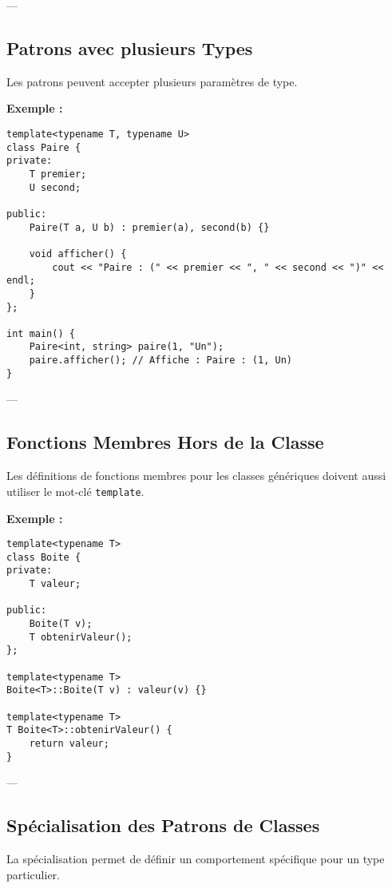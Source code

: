 ---

\subsection{ Patrons avec plusieurs Types}
Les patrons peuvent accepter plusieurs paramètres de type.

\textbf{Exemple :}
\begin{tcolorbox}[colframe=blue!50!black, colback=blue!5!white, title=Exemple de Patron avec Plusieurs Types]
\begin{verbatim}
template<typename T, typename U>
class Paire {
private:
    T premier;
    U second;

public:
    Paire(T a, U b) : premier(a), second(b) {}

    void afficher() {
        cout << "Paire : (" << premier << ", " << second << ")" << endl;
    }
};

int main() {
    Paire<int, string> paire(1, "Un");
    paire.afficher(); // Affiche : Paire : (1, Un)
}
\end{verbatim}
\end{tcolorbox}

---

\subsection{ Fonctions Membres Hors de la Classe}
Les définitions de fonctions membres pour les classes génériques doivent aussi utiliser le mot-clé \texttt{template}.

\textbf{Exemple :}
\begin{tcolorbox}[colframe=blue!50!black, colback=blue!5!white, title=Exemple de Fonctions Membres Hors de la Classe]
\begin{verbatim}
template<typename T>
class Boite {
private:
    T valeur;

public:
    Boite(T v);
    T obtenirValeur();
};

template<typename T>
Boite<T>::Boite(T v) : valeur(v) {}

template<typename T>
T Boite<T>::obtenirValeur() {
    return valeur;
}
\end{verbatim}
\end{tcolorbox}

---

\subsection{ Spécialisation des Patrons de Classes}
La spécialisation permet de définir un comportement spécifique pour un type particulier.

